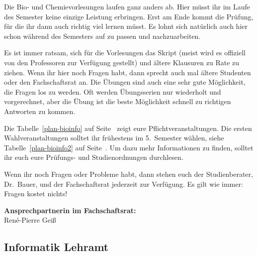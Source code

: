 Die Bio- und Chemievorlesungen laufen ganz anders ab.
Hier müsst ihr im Laufe des Semester keine einzige Leistung erbringen.
Erst am Ende kommt die Prüfung, für die ihr dann auch richtig viel lernen müsst.
Es lohnt sich natürlich auch hier schon während des Semesters auf zu passen und nachzuarbeiten.

Es ist immer ratsam, sich für die Vorlesungen das Skript (meist wird es offiziell von den Professoren zur Verfügung gestellt) und ältere Klausuren zu Rate zu ziehen.
Wenn ihr hier noch Fragen habt, dann sprecht auch mal ältere Studenten oder den Fachschaftsrat an.
Die Übungen sind auch eine sehr gute Möglichkeit, die Fragen los zu werden.
Oft werden Übungsserien nur wiederholt und vorgerechnet, aber die Übung ist die beste Möglichkeit schnell zu richtigen Antworten zu kommen.

Die Tabelle~\ref{plan-bioinfo} auf Seite~\pageref{plan-bioinfo} zeigt eure Pflichtveranstaltungen.
Die ersten Wahlveranstaltungen solltet ihr frühestens im 5.~Semester wählen, siehe Tabelle~\ref{plan-bioinfo2} auf Seite~\pageref{plan-bioinfo2}.
Um dazu mehr Informationen zu finden, solltet ihr euch eure Prüfungs- und Studienordnungen durchlesen.

Wenn ihr noch Fragen oder Probleme habt, dann stehen euch der Studienberater, Dr.~Bauer, und der Fachschaftsrat jederzeit zur Verfügung.
Es gilt wie immer: Fragen kostet nichts!

\textbf{Ansprechpartnerin im Fachschaftsrat:}\\
René-Pierre Geiß\\



\subsection{Informatik Lehramt}
\label{studiengang_infolehramt}

